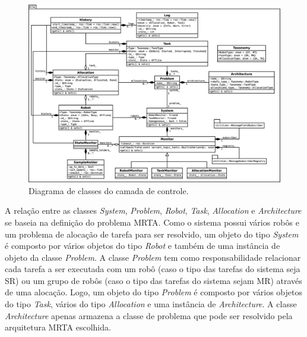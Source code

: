             \begin{figure}[p]
                \centering
                \includegraphics[height=\textwidth,angle=90]{Figuras/3_desenvolvimento/rqt_mrta_controller_uml.eps}
                \caption{Diagrama de classes do camada de controle.} \label{fig:rqt_mrta_controller_uml}
            \end{figure}
            
            A relação entre as classes \textit{System}, \textit{Problem}, \textit{Robot}, \textit{Task}, \textit{Allocation} e \textit{Architecture} se baseia na definição do problema MRTA. Como o sistema possui vários robôs e um problema de alocação de tarefa para ser resolvido, um objeto do tipo \textit{System} é composto por vários objetos do tipo \textit{Robot} e também de uma instância de objeto da classe \textit{Problem}. A classe \textit{Problem} tem como responsabilidade relacionar cada tarefa a ser executada com um robô (caso o tipo das tarefas do sistema seja SR) ou um grupo de robôs (caso o tipo das tarefas do sistema sejam MR) através de uma alocação. Logo, um objeto do tipo \textit{Problem} é composto por vários objetos do tipo \textit{Task}, vários do tipo \textit{Allocation} e uma instância de \textit{Architecture}. A classe \textit{Architecture} apenas armazena a classe de problema que pode ser resolvido pela arquitetura MRTA escolhida. 
            

